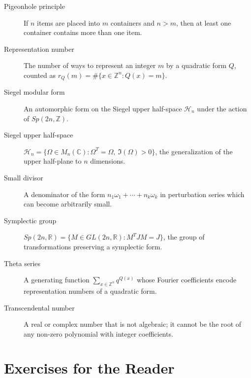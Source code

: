 \begin{description}
    \item[Pigeonhole principle] If $n$ items are placed into $m$ containers and $n > m$, then at least one container contains more than one item.
    \item[Representation number] The number of ways to represent an integer $m$ by a quadratic form $Q$, counted as $r_Q(m) = \#\{x \in \mathbb{Z}^n : Q(x) = m\}$.
    \item[Siegel modular form] An automorphic form on the Siegel upper half-space $\mathcal{H}_n$ under the action of $Sp(2n,\mathbb{Z})$.
    \item[Siegel upper half-space] $\mathcal{H}_n = \{\Omega \in M_n(\mathbb{C}) : \Omega^T = \Omega,\ \Im(\Omega) > 0\}$, the generalization of the upper half-plane to $n$ dimensions.
    \item[Small divisor] A denominator of the form $n_1\omega_1 + \cdots + n_k\omega_k$ in perturbation series which can become arbitrarily small.
    \item[Symplectic group] $Sp(2n,\mathbb{R}) = \{M \in GL(2n,\mathbb{R}) : M^T J M = J\}$, the group of transformations preserving a symplectic form.
    \item[Theta series] A generating function $\sum_{x \in \mathbb{Z}^n} q^{Q(x)}$ whose Fourier coefficients encode representation numbers of a quadratic form.
    \item[Transcendental number] A real or complex number that is not algebraic; it cannot be the root of any non-zero polynomial with integer coefficients.
\end{description}

\section*{Exercises for the Reader}

